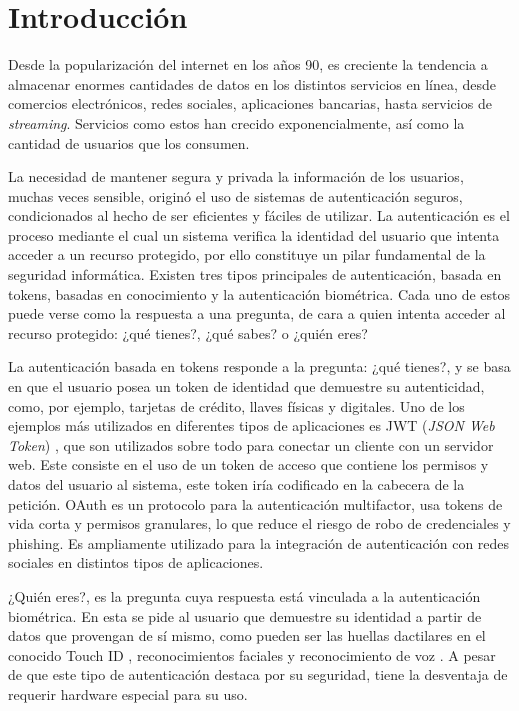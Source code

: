 \chapter*{Introducción}\label{chapter:introduction}
Desde la popularización del internet en los años 90, es creciente la tendencia a almacenar enormes cantidades de datos en los distintos servicios en línea, desde comercios electrónicos, redes sociales, aplicaciones bancarias, hasta servicios de \textit{streaming}. Servicios como estos han crecido exponencialmente, así como la cantidad de usuarios que los consumen. 

La necesidad de mantener segura y privada la información de los usuarios, muchas veces sensible, originó el uso de sistemas de autenticación seguros, condicionados al hecho de ser eficientes y fáciles de utilizar. La autenticación es el proceso mediante el cual un sistema verifica la identidad del usuario que intenta acceder a un recurso protegido, por ello constituye un pilar fundamental de la seguridad informática. Existen tres tipos principales de autenticación, basada en tokens, basadas en conocimiento y la autenticación biométrica. Cada uno de estos puede verse como la respuesta a una pregunta, de cara a quien intenta acceder al recurso protegido: ¿qué tienes?, ¿qué sabes? o ¿quién eres?

La autenticación basada en tokens responde a la pregunta: ¿qué tienes?, y se basa en que el usuario posea un token de identidad que demuestre su autenticidad, como, por ejemplo, tarjetas de crédito, llaves físicas y digitales. Uno de los ejemplos más utilizados en diferentes tipos de aplicaciones es JWT (\textit{JSON Web Token})   \cite{massimo_nardone__2023}, que son utilizados sobre todo para conectar un cliente con un servidor web. Este consiste en el uso de un token de acceso que contiene los permisos y datos del usuario al sistema, este token iría codificado en la cabecera de la petición. OAuth  \cite{aravind_ayyagiri__2023} es un protocolo para la autenticación multifactor, usa tokens de vida corta y permisos granulares, lo que reduce el riesgo de robo de credenciales y phishing. Es ampliamente utilizado para la integración de autenticación con redes sociales en distintos tipos de aplicaciones.

¿Quién eres?, es la pregunta cuya respuesta está vinculada a la autenticación biométrica. En esta se pide al usuario que demuestre su identidad a partir de datos que provengan de sí mismo, como pueden ser las huellas dactilares en el conocido Touch ID  \cite{liu_jin__2019}, reconocimientos faciales \cite{nur_dua_fathansyah_atan__2024} y reconocimiento de voz \cite{saquib2011voiceprint}. A pesar de que este tipo de autenticación destaca por su seguridad, tiene la desventaja de requerir hardware especial para su uso. 

